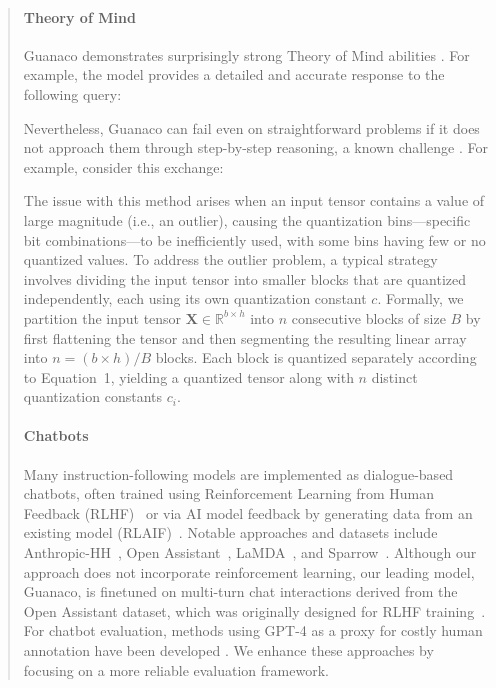 \begin{quote}
\paragraph{Theory of Mind} {Guanaco} demonstrates surprisingly strong Theory of Mind abilities \cite{nematzadeh2018evaluating, sap2022neural}. For example, the model provides a detailed and accurate response to the following query:

Nevertheless, {Guanaco} can fail even on straightforward problems if it does not approach them through step-by-step reasoning, a known challenge \cite{weichain}. For example, consider this exchange:

The issue with this method arises when an input tensor contains a value of large magnitude (i.e., an outlier), causing the quantization bins—specific bit combinations—to be inefficiently used, with some bins having few or no quantized values. To address the outlier problem, a typical strategy involves dividing the input tensor into smaller blocks that are quantized independently, each using its own quantization constant $c$. Formally, we partition the input tensor $\mathbf{X}\in \mathbb{R}^{b\times h}$ into $n$ consecutive blocks of size $B$ by first flattening the tensor and then segmenting the resulting linear array into ${n = ({b\times h} )/{B} }$ blocks. Each block is quantized separately according to Equation~1, yielding a quantized tensor along with $n$ distinct quantization constants $c_i$.

\paragraph{Chatbots} Many instruction-following models are implemented as dialogue-based chatbots, often trained using Reinforcement Learning from Human Feedback (RLHF)~\citep{christiano2017deep} or via AI model feedback by generating data from an existing model (RLAIF)~\citep{bai2022constitutional}. Notable approaches and datasets include Anthropic-HH~\citep{askell2021general,bai2022training}, Open Assistant~\citep{kopf2023openassistant}, LaMDA~\citep{thoppilan2022lamda}, and Sparrow~\citep{glaese2022improving}. Although our approach does not incorporate reinforcement learning, our leading model, Guanaco, is finetuned on multi-turn chat interactions derived from the Open Assistant dataset, which was originally designed for RLHF training~\citep{kopf2023openassistant}. For chatbot evaluation, methods using GPT-4 as a proxy for costly human annotation have been developed \citep{vicuna2023,peng2023instruction}. We enhance these approaches by focusing on a more reliable evaluation framework.


\end{quote}
